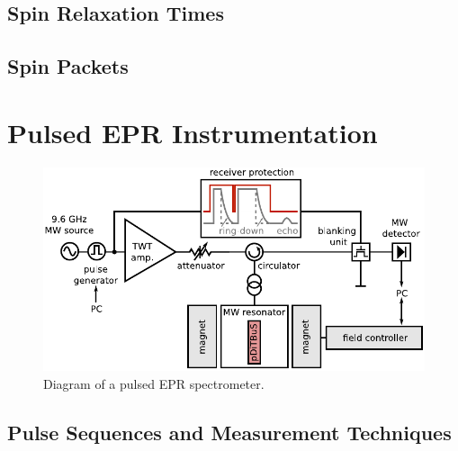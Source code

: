 \subsection{Spin Relaxation Times}
\subsection{Spin Packets}

\section{Pulsed EPR Instrumentation}

\begin{figure}[h]
\center
	\includegraphics[width=1\textwidth]{./pulse/figures/pEPR_spectrometer_diagram.pdf}
	\caption{Diagram of a pulsed EPR spectrometer.}
	\label{fig:pepr_spectrometer_diagram}
\end{figure}

\subsection{Pulse Sequences and Measurement Techniques}
